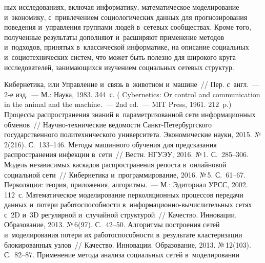 \begin{multicols}{2}
\begin{enumerate}[1.]
\pagebreak

\noindent
 ных исследованиях, вклю\-чая информатику, ма\-те\-матическое 
моделирование и~экономику, с~при\-вле\-че\-ни\-ем социологических данных для 
прогнозирования поведения и~управ\-ле\-ния группами людей в~сетевых 
сообществах. Кроме того, полученные результаты дополняют и~расширяют 
применение методов и~подходов, принятых в~классической информатике, на 
описание социальных и~социотехнических сис\-тем, что может быть полезно для 
широкого круга исследователей, занимающихся изуче\-ни\-ем социальных 
сетевых струк\-тур.
\end{enumerate}

\vspace*{-6pt}

{\small\frenchspacing
 {%
 \begin{thebibliography}{99}
  Кибернетика, или Управление и~связь в~животном и~машине~//
 Пер. с~англ.~--- 2-е изд.~--- М.: Наука, 1983. 344~с.
 ( Cybernetics: Or control and communication in 
 the animal and the machine.~---
 2nd ed.~--- MIT Press, 1961. 212~p.)
 Процессы распространения знаний 
в~параметризованной сети информационных обменов~// На\-уч\-но-тех\-ни\-че\-ские 
ведомости Санкт-Пе\-тер\-бург\-ско\-го государственного политехнического 
университета. Экономические науки, 2015. №\,2(216). С.~133--146.
 Методы машинного обучения для предсказания распространения 
инфекции в~сети~// Вестн. НГУЭУ, 2016. №\,1. С.~285--306.
 Модель независимых каскадов распространения репоста 
в~онлайновой социальной сети~// Кибернетика и~программирование, 2016. №\,5.  
С.~61--67.
 Перколяции: теория, приложения, алгоритмы.~--- М.: Эдиториал 
УРСС, 2002. 112~с.
 Математическое моделирование 
перколяционных процессов передачи данных и~потери работоспособности  
в~ин\-фор\-ма\-ци\-он\-но-вы\-чис\-ли\-тель\-ных сетях с~2D и~3D регулярной и~случайной 
структурой~// Качество. Инновации. Образование, 2013. №\,6(97). С.~42--50.
 Алгоритмы построения 
сетей и~моделирования потери их работоспособности в~результате кластеризации 
блокированных узлов~// Качество. Инновации. Образование, 2013. №\,12(103). С.~82--87. 
 Применение метода анализа социальных сетей в~моделировании 

\end{thebibliography}}}
\end{multicols}

